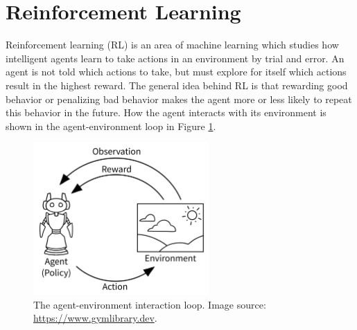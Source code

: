 \documentclass[a4paper]{article}
\begin{document}
\section{Reinforcement Learning} \label{s:reinforcement-learning}
Reinforcement learning (RL) is an area of machine learning which studies how intelligent agents learn to take actions in an environment by trial and error.
An agent is not told which actions to take, but must explore for itself which actions result in the highest reward.
The general idea behind RL is that rewarding good behavior or penalizing bad behavior makes the agent more or less likely to repeat this behavior in the future.
How the agent interacts with its environment is shown in the agent-environment loop in Figure \ref{fig:loop}.

\begin{figure}[htbp]
    \centering
    \includegraphics[width=0.6\textwidth]{AE_loop}
    \caption{The agent-environment interaction loop. Image source: \url{https://www.gymlibrary.dev}.}
    \label{fig:loop}
\end{figure}
\end{document}
